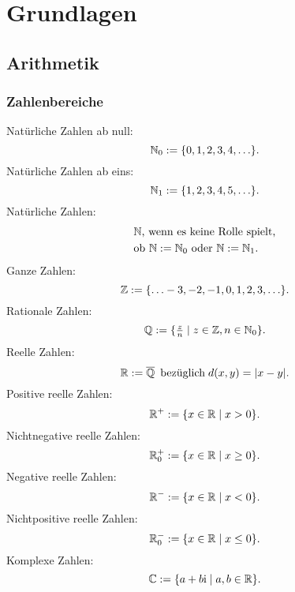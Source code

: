 
\chapter{Grundlagen}
\section{Arithmetik}
\subsection{Zahlenbereiche}
Natürliche Zahlen ab null:
\begin{equation}
\mathbb N_0 := \{0,1,2,3,4,\ldots\}.
\end{equation}
Natürliche Zahlen ab eins:
\begin{equation}
\mathbb N_1 := \{1,2,3,4,5,\ldots\}.
\end{equation}
Natürliche Zahlen:
\begin{equation}
\begin{split}
&\text{$\mathbb N$, wenn es keine Rolle spielt,}\\
&\text{ob $\mathbb N:=\mathbb N_0$ oder $\mathbb N:=\mathbb N_1$}.
\end{split}
\end{equation}
Ganze Zahlen:
\begin{equation}
\mathbb Z := \{\ldots -3,-2,-1,0,1,2,3,\ldots\}.
\end{equation}
Rationale Zahlen:
\begin{equation}
\mathbb Q := \{\tfrac{z}{n}\mid z\in\mathbb Z,n\in\mathbb N_0\}.
\end{equation}
Reelle Zahlen:
\begin{equation}
\mathbb R := \overline{\mathbb Q}\enspace\text{bezüglich}\; d(x,y)=|x-y|.
\end{equation}
Positive reelle Zahlen:
\begin{equation}
\mathbb R^+ := \{x\in\mathbb R\mid x>0\}.
\end{equation}
Nichtnegative reelle Zahlen:
\begin{equation}
\mathbb R_0^+ := \{x\in\mathbb R\mid x\ge 0\}.
\end{equation}
Negative reelle Zahlen:
\begin{equation}
\mathbb R^- := \{x\in\mathbb R\mid x<0\}.
\end{equation}
Nichtpositive reelle Zahlen:
\begin{equation}
\mathbb R_0^- := \{x\in\mathbb R\mid x\le 0\}.
\end{equation}
Komplexe Zahlen:
\begin{equation}
\mathbb C := \{a+b\mathrm i\mid a,b\in\mathbb R\}.
\end{equation}
